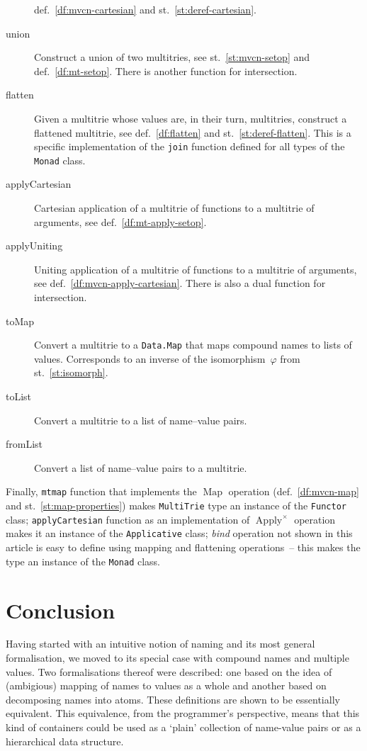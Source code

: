 \documentclass{article}
\theoremstyle{definition}
\newcommand{\fmap}{\operatorname{Map}}
\newcommand{\apply}{\operatorname{Apply}}
\begin{document}
\begin{description}
  def.~\ref{df:mvcn-cartesian} and st.~\ref{st:deref-cartesian}.
\item [union]
  Construct a union of two multitries, see st.~\ref{st:mvcn-setop} and
  def.~\ref{df:mt-setop}. There is another function for intersection.
\item [flatten]
  Given a multitrie whose values are, in their turn, multitries, construct
  a flattened multitrie, see def.~\ref{df:flatten} and
  st.~\ref{st:deref-flatten}. This is a specific implementation of the
  \lstinline{join} function defined for all types of the \lstinline{Monad}
  class.
\item [applyCartesian]
  Cartesian
  application of a multitrie of functions to a multitrie of arguments, see
  def.~\ref{df:mt-apply-setop}.
\item [applyUniting]
  Uniting
  application of a multitrie of functions to a multitrie of arguments, see
  def.~\ref{df:mvcn-apply-cartesian}.
  There is also a dual function for intersection.
\item [toMap]
  Convert a multitrie to a \lstinline{Data.Map} that maps compound names to
  lists of values. Corresponds to an inverse of the isomorphism~$\varphi$
  from st.~\ref{st:isomorph}.
\item [toList]
  Convert a multitrie to a list of name--value pairs.
\item [fromList]
  Convert a list of name--value pairs to a multitrie.
\end{description}

Finally, \lstinline{mtmap} function that implements the $\fmap$ operation
(def.~\ref{df:mvcn-map} and st.~\ref{st:map-properties})
makes \lstinline{MultiTrie} type an instance of the \lstinline{Functor} class; 
\lstinline{applyCartesian} function as an implementation of $\apply^{\times}$
operation makes it an instance of the \lstinline{Applicative} class; 
\emph{bind} operation not shown in this article is easy to define using mapping
and flattening operations~-- this makes the type an instance of the
\lstinline{Monad} class.



\section{Conclusion}

Having started with an intuitive notion of naming and its most general
formalisation, we moved to its special case with compound names and multiple
values. Two formalisations thereof were described: one based on the idea of
(ambigious) mapping of names to values as a whole and another based on
decomposing names into atoms. These definitions are shown to be essentially
equivalent. This equivalence, from the programmer's perspective, means that
this kind of containers could be used as a `plain' collection of name-value
pairs or as a hierarchical data structure.
\end{document}

